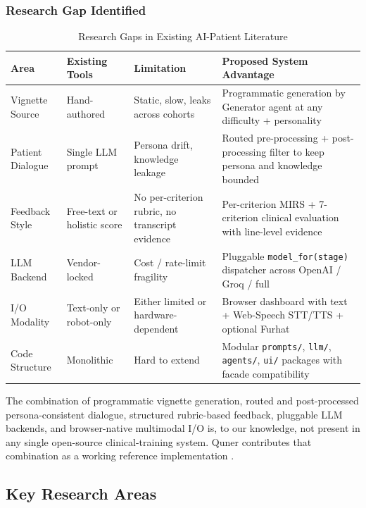 \documentclass{article}
\begin{document}
\subsubsection{Research Gap Identified}

\begin{table}[h!]
\centering
\renewcommand{\arraystretch}{1.3}
\begin{tabular}{|p{3cm}|p{3cm}|p{4cm}|p{4cm}|}
\hline
\textbf{Area} & \textbf{Existing Tools} & \textbf{Limitation} & \textbf{Proposed System Advantage} \\ \hline
Vignette Source & Hand-authored & Static, slow, leaks across cohorts & Programmatic generation by Generator agent at any difficulty + personality \\ \hline
Patient Dialogue & Single LLM prompt & Persona drift, knowledge leakage & Routed pre-processing + post-processing filter to keep persona and knowledge bounded \\ \hline
Feedback Style & Free-text or holistic score & No per-criterion rubric, no transcript evidence & Per-criterion MIRS + 7-criterion clinical evaluation with line-level evidence \\ \hline
LLM Backend & Vendor-locked & Cost / rate-limit fragility & Pluggable \texttt{model\_for(stage)} dispatcher across OpenAI / Groq / full \\ \hline
I/O Modality & Text-only or robot-only & Either limited or hardware-dependent & Browser dashboard with text + Web-Speech STT/TTS + optional Furhat \\ \hline
Code Structure & Monolithic & Hard to extend & Modular \texttt{prompts/}, \texttt{llm/}, \texttt{agents/}, \texttt{ui/} packages with facade compatibility \\ \hline
\end{tabular}
\caption{Research Gaps in Existing AI-Patient Literature}
\end{table}

The combination of programmatic vignette generation, routed and post-processed persona-consistent dialogue, structured rubric-based feedback, pluggable LLM backends, and browser-native multimodal I/O is, to our knowledge, not present in any single open-source clinical-training system. Quner contributes that combination as a working reference implementation \cite{Beloki2017ASA,Stokes2015ScalingNA}.

\subsection{Key Research Areas}
\end{document}
